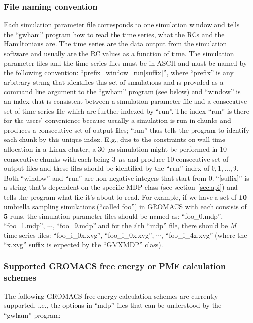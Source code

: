 \subsubsection{File naming convention}\label{sec:fname}
Each simulation parameter file corresponds to one simulation window and tells
the ``gwham'' program how to read the time series, what the RCs and the
Hamiltonians are. The time series are the data output from the simulation
software and usually are the RC values as a function of time. The simulation
parameter files and the time series files must be in ASCII and must be named by
the following convention: ``prefix\_window\_run[suffix]'', where ``prefix'' is
any arbitrary string that identifies this set of simulations and is provided as
a command line argument to the ``gwham'' program (see below) and ``window'' is
an index that is consistent between a simulation parameter file and a
consecutive set of time series file which are further indexed by ``run''. The
index ``run'' is there for the users' convenience because usually a simulation
is run in chunks and produces a consecutive set of output files; ``run'' thus
tells the program to identify each chunk by this unique index. E.g., due to the
constraints on wall time allocation in a Linux cluster, a 30~$\mu$s simulation
might be performed in $10$ consecutive chunks with each being $3$~$\mu$s and
produce $10$ consecutive set of output files and these files should be
identified by the ``run'' index of $0,1,\dotsc,9$.  Both ``window'' and ``run''
are non-negative integers that start from 0. ``[suffix]'' is a string that's
dependent on the specific MDP class (see section~\ref{sec:api}) and tells the
program what file it's about to read.  For example, if we have a set of
$\mathbf{10}$ umbrella sampling simulations (``called foo'') in GROMACS with
each consists of $\mathbf{5}$ runs, the simulation parameter files should be
named as: ``foo\_0.mdp'', ``foo\_1.mdp'', $\cdots$, ``foo\_9.mdp'' and for the
$i$'th ``mdp'' file, there should be $M$ time series files: ``foo\_i\_0x.xvg'',
``foo\_i\_0x.xvg'', $\cdots$, ``foo\_i\_4x.xvg'' (where the ``x.xvg'' suffix is
expected by the ``GMXMDP'' class). 

\subsubsection{Supported GROMACS free energy or PMF calculation schemes}
The following GROMACS free energy calculation schemes are currently supported, i.e., 
the options in ``mdp'' files that can be understood by the ``gwham'' program:

